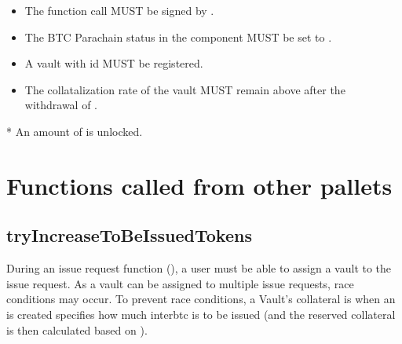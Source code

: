 \documentclass[a4paper,10pt,english]{sphinxmanual}
\begin{document}
\begin{itemize}
\item {} 
The function call MUST be signed by .

\item {} 
The BTC Parachain status in the {\hyperref[\detokenize{spec/security:security}]{}} component MUST be set to .

\item {} 
A vault with id  MUST be registered.

\item {} 
The collatalization rate of the vault MUST remain above  after the withdrawal of .

\end{itemize}

* An amount of  is unlocked.


\section{Functions called from other pallets}
\label{\detokenize{spec/vault-registry:functions-called-from-other-pallets}}

\subsection{tryIncreaseToBeIssuedTokens}
\label{\detokenize{spec/vault-registry:tryincreasetobeissuedtokens}}\label{\detokenize{spec/vault-registry:id13}}
During an issue request function ({\hyperref[\detokenize{spec/issue:requestissue}]{}}), a user must be able to assign a vault to the issue request. As a vault can be assigned to multiple issue requests, race conditions may occur. To prevent race conditions, a Vault’s collateral is  when an  is created \sphinxhyphen{}  specifies how much interbtc is to be issued (and the reserved collateral is then calculated based on {\hyperref[\detokenize{spec/oracle:getexchangerate}]{}}).
\end{document}
